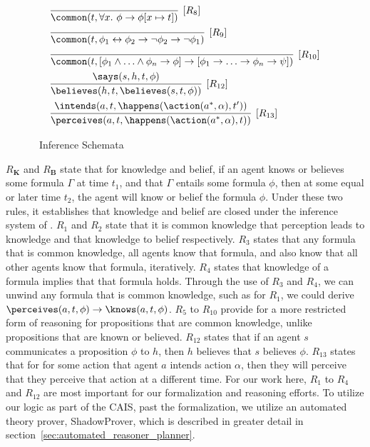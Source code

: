 \begin{figure}[h]
\begin{mdframed}[nobreak=true, roundcorner=8pt, frametitlealignment=\centering]
\begin{equation*}
\begin{aligned}
& \infer[{[R_8]}]{\common(t, \forall x. \  \phi \lif \phi[x\mapsto
  t])}{} \\
& \infer[{[R_9]}]{\common(t,\phi_1 \liff \phi_2 \lif \neg
    \phi_2 \lif \neg \phi_1)}{}\\
& \infer[{[R_{10}]}] {\common(t,[\phi_1\land\ldots\land\phi_n\lif\phi]
  \lif [\phi_1\lif\ldots\lif\phi_n\lif\psi])}{}\\
& \infer[{[R_{12}]}]{\believes(h,t,\believes(s,t,\phi))}{\says(s,h,t,\phi)} \\
& \infer[{[R_{13}]}]{\perceives(a,t,\happens(\action(a^\ast,\alpha),t))}{\intends(a,t,\happens(\action(a^\ast,\alpha),t'))}
\end{aligned}
\end{equation*}
\end{mdframed}
\caption{\CEC\ Inference Schemata}
\label{fig:cec_schemata}
\end{figure}

$R_\mathbf{K}$ and $R_\mathbf{B}$ state that for knowledge and belief, if an
agent knows or believes some formula $\Gamma$ at time $t_{1}$, and that $\Gamma$
entails some formula $\phi$, then at some equal or later time $t_{2}$, the
agent will know or belief the formula $\phi$. Under these two rules, it
establishes that knowledge and belief are closed under the inference system of
\CEC. $R_{1}$ and $R_{2}$ state that it is common knowledge that perception
leads to knowledge and that knowledge to belief respectively. $R_{3}$ states that
any formula that is common knowledge, all agents know that formula, and also know
that all other agents know that formula, iteratively. $R_{4}$ states that
knowledge  of a formula implies that that formula holds. Through the use of
$R_{3}$ and $R_{4}$, we can unwind any formula that is common knowledge, such
as for $R_1$, we could derive
$\perceives(a, t, \phi) \rightarrow \knows(a, t, \phi)$. $R_5$ to $R_{10}$
provide for a more restricted form of reasoning for propositions that are common
knowledge, unlike propositions that are known or believed.  $R_{12}$
states that if an agent $s$ communicates a proposition $\phi$ to $h$,
then $h$ believes that $s$ believes $\phi$. $R_{13}$ states that for for some
action that agent $a$ intends action $\alpha$, then they will perceive that they
perceive that action at a different time. For our work here, $R_{1}$ to $R_{4}$
and $R_{12}$ are most important for our formalization and reasoning efforts.
To utilize our logic as part of the CAIS, past the formalization, we utilize
an automated theory prover, \textsf{ShadowProver}, which is described in greater
detail in section~\ref{sec:automated_reasoner_planner}.
